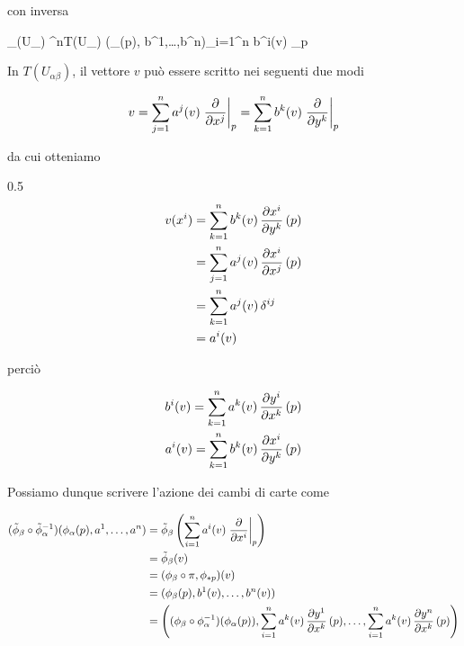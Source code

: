 con inversa

	{\phi_{\beta}(U_{\beta}) \times \R^{n}}{T(U_{\beta})}
	{(\phi_{\beta}(p), b^{1},\dots,b^{n})}{\sum_{i=1}^{n} b^{i}(v) _{p}}

In $ T(U_{\alpha \beta}) $, il vettore $ v $ può essere scritto nei seguenti due modi

\begin{equation}
	v = \sum_{j=1}^{n} a^{j}(v) \eval{ \pdv{x^{j}} }_{p} = %
	\sum_{k=1}^{n} b^{k}(v) \eval{ \pdv{y^{k}} }_{p}
\end{equation}

da cui otteniamo

	{0.5}{%
			\begin{align}
				\begin{split}
					v(x^{i}) &= \sum_{k=1}^{n} b^{k}(v) \, \pdv{x^{i}}{y^{k}} \, (p) \\
					&= \sum_{j=1}^{n} a^{j}(v) \, \pdv{x^{i}}{x^{j}} \, (p) \\
					&= \sum_{k=1}^{n} a^{j}(v) \, \delta^{ij} \\
					&= a^{i}(v)
				\end{split}
			\end{align}
			}

perciò

\begin{gather}
		b^{i}(v) = \sum_{k=1}^{n} a^{k}(v) \, \pdv{y^{i}}{x^{k}} \, (p) \\
		a^{i}(v) = \sum_{k=1}^{n} b^{k}(v) \, \pdv{x^{i}}{y^{k}} \, (p)
\end{gather}

Possiamo dunque scrivere l'azione dei cambi di carte come

\begin{align}
	\begin{split}
		(\tilde{\phi}_{\beta} \circ \tilde{\phi}_{\alpha}^{-1}) (\phi_{\alpha}(p), a^{1},\dots,a^{n}) &= \tilde{\phi}_{\beta} \left( \sum_{i=1}^{n} a^{i}(v) \eval{ \pdv{x^{i}} }_{p} \right) \\
		&= \tilde{\phi}_{\beta}(v) \\
		&= (\phi_{\beta} \circ \pi, \phi_{*p})(v) \\
		&= ( \phi_{\beta}(p), b^{1}(v),\dots,b^{n}(v) ) \\
		&= \left( (\phi_{\beta} \circ \phi_{\alpha}^{-1})(\phi_{\alpha}(p)), \sum_{i=1}^{n} a^{k}(v) \, \pdv{y^{1}}{x^{k}} \, (p) ,\dots, \sum_{i=1}^{n} a^{k}(v) \, \pdv{y^{n}}{x^{k}} \, (p) \right)
	\end{split}
\end{align}

